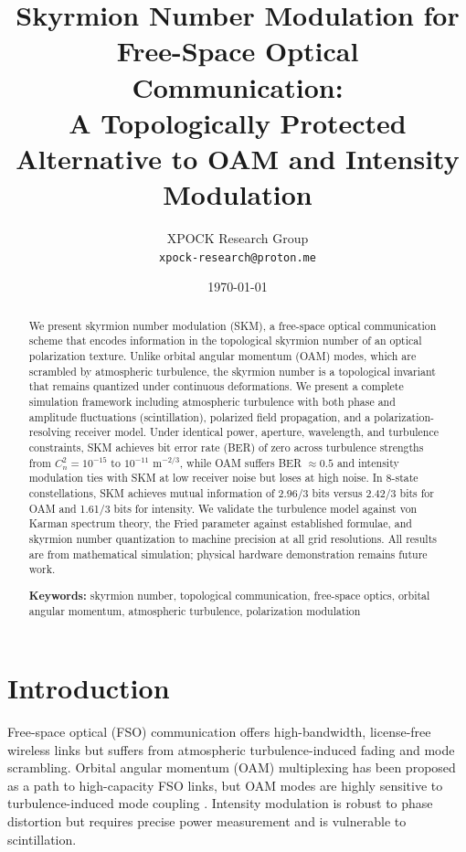 \documentclass[11pt]{article}
\title{Skyrmion Number Modulation for Free-Space Optical Communication:\\
A Topologically Protected Alternative to OAM and Intensity Modulation}
\author{XPOCK Research Group\\
\texttt{xpock-research@proton.me}}
\date{\today}
\begin{document}
\maketitle

\begin{abstract}
We present skyrmion number modulation (SKM), a free-space optical communication
scheme that encodes information in the topological skyrmion number of an optical
polarization texture. Unlike orbital angular momentum (OAM) modes, which are
scrambled by atmospheric turbulence, the skyrmion number is a topological
invariant that remains quantized under continuous deformations. We present a
complete simulation framework including atmospheric turbulence with both phase
and amplitude fluctuations (scintillation), polarized field propagation, and a
polarization-resolving receiver model. Under identical power, aperture,
wavelength, and turbulence constraints, SKM achieves bit error rate (BER) of
zero across turbulence strengths from $C_n^2 = 10^{-15}$ to $10^{-11}$ m$^{-2/3}$,
while OAM suffers BER $\approx 0.5$ and intensity modulation ties with SKM at
low receiver noise but loses at high noise. In 8-state constellations, SKM
achieves mutual information of 2.96/3 bits versus 2.42/3 bits for OAM and
1.61/3 bits for intensity. We validate the turbulence model against von Karman
spectrum theory, the Fried parameter against established formulae, and skyrmion
number quantization to machine precision at all grid resolutions. All results
are from mathematical simulation; physical hardware demonstration remains
future work.

\vspace{0.5cm}
\noindent\textbf{Keywords:} skyrmion number, topological communication,
free-space optics, orbital angular momentum, atmospheric turbulence,
polarization modulation
\end{abstract}

\section{Introduction}

Free-space optical (FSO) communication offers high-bandwidth, license-free
wireless links but suffers from atmospheric turbulence-induced fading and
mode scrambling. Orbital angular momentum (OAM) multiplexing has been proposed
as a path to high-capacity FSO links, but OAM modes are highly sensitive to
turbulence-induced mode coupling \cite{tao2016orbit,li2018atmospheric}.
Intensity modulation is robust to phase distortion but requires precise
power measurement and is vulnerable to scintillation.
\end{document}
